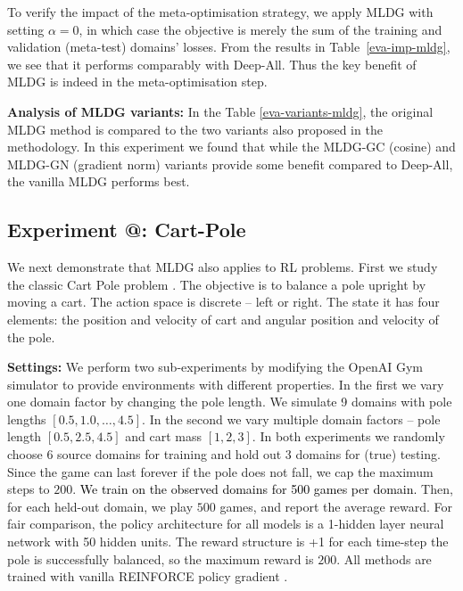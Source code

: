 \documentclass[letterpaper]{article} \usepackage{aaai18}  \usepackage{times}  \usepackage{helvet}  \usepackage{courier}  \usepackage{url}  \usepackage{graphicx}  \usepackage{amsmath}
\makeatletter
\newcommand*{\rom}[1]{\expandafter\@slowromancap\romannumeral #1@}
\newcommand{\keypoint}[1]{\vspace{0.1cm}\noindent\textbf{#1}\quad}
\makeatother
\begin{document}
{To verify the impact of the meta-optimisation strategy, we apply MLDG with setting $\alpha=0$, in which case the objective is merely the sum of the training and validation (meta-test) domains' losses. From the results in  Table~\ref{eva-imp-mldg}, we see that it performs comparably with Deep-All. Thus the key benefit of MLDG is indeed in the meta-optimisation step. 

\keypoint{Analysis of MLDG variants:} In the Table \ref{eva-variants-mldg}, the original MLDG method is compared to the two variants also proposed in the methodology. 
In this experiment we found that while the MLDG-GC (cosine) and MLDG-GN (gradient norm) variants provide some benefit compared to Deep-All, the vanilla MLDG performs best. 







\subsection{Experiment \rom{3}: Cart-Pole}
We next demonstrate that MLDG also applies to RL problems. First we study the classic Cart Pole problem \cite{openaigym}. The objective is to balance a pole upright by moving a cart. The action space is discrete --  left or right. The state it has four elements: the position and velocity of cart and angular position and velocity of the pole. 

\keypoint{Settings:} We perform two sub-experiments by modifying the OpenAI Gym simulator to provide environments with different properties. In the first we vary one domain factor by changing the pole length. We simulate 9 domains with pole lengths $[0.5,1.0,\dots,4.5]$.  In the second we vary multiple domain factors -- pole length $[0.5, 2.5, 4.5]$ and cart mass $[1, 2, 3]$. In both experiments we randomly choose 6 source domains for training and hold out 3 domains for (true) testing. Since the game can last forever if the pole does not fall, we cap the maximum steps to $200$. \textcolor{black}{We train on the observed domains for 500 games per domain.}
Then, for each held-out domain, we play $500$ games, and report the average reward. For fair comparison, the policy architecture for all models is a 1-hidden layer neural network with 50 hidden units. The reward structure is +1 for each time-step the pole is successfully balanced, so the maximum reward is $200$. All methods are trained with vanilla REINFORCE policy gradient \cite{williams1992reinforce}. 

}
\end{document}
